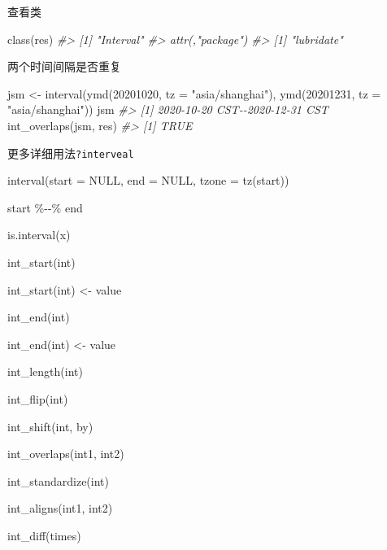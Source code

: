 \documentclass[
]{book}
\newenvironment{Shaded}{\begin{snugshade}}{\end{snugshade}}
\newcommand{\AttributeTok}[1]{\textcolor[rgb]{0.77,0.63,0.00}{#1}}
\newcommand{\CommentTok}[1]{\textcolor[rgb]{0.56,0.35,0.01}{\textit{#1}}}
\newcommand{\ConstantTok}[1]{\textcolor[rgb]{0.00,0.00,0.00}{#1}}
\newcommand{\DecValTok}[1]{\textcolor[rgb]{0.00,0.00,0.81}{#1}}
\newcommand{\FunctionTok}[1]{\textcolor[rgb]{0.00,0.00,0.00}{#1}}
\newcommand{\NormalTok}[1]{#1}
\newcommand{\OtherTok}[1]{\textcolor[rgb]{0.56,0.35,0.01}{#1}}
\newcommand{\SpecialCharTok}[1]{\textcolor[rgb]{0.00,0.00,0.00}{#1}}
\newcommand{\StringTok}[1]{\textcolor[rgb]{0.31,0.60,0.02}{#1}}
\begin{document}
查看类

\begin{Shaded}
\begin{Highlighting}[]
\FunctionTok{class}\NormalTok{(res)}
\CommentTok{\#\textgreater{} [1] "Interval"}
\CommentTok{\#\textgreater{} attr(,"package")}
\CommentTok{\#\textgreater{} [1] "lubridate"}
\end{Highlighting}
\end{Shaded}

两个时间间隔是否重复

\begin{Shaded}
\begin{Highlighting}[]
\NormalTok{jsm }\OtherTok{\textless{}{-}} \FunctionTok{interval}\NormalTok{(}\FunctionTok{ymd}\NormalTok{(}\DecValTok{20201020}\NormalTok{, }\AttributeTok{tz =} \StringTok{"asia/shanghai"}\NormalTok{), }\FunctionTok{ymd}\NormalTok{(}\DecValTok{20201231}\NormalTok{, }\AttributeTok{tz =} \StringTok{"asia/shanghai"}\NormalTok{))}
\NormalTok{jsm}
\CommentTok{\#\textgreater{} [1] 2020{-}10{-}20 CST{-}{-}2020{-}12{-}31 CST}
\FunctionTok{int\_overlaps}\NormalTok{(jsm, res)}
\CommentTok{\#\textgreater{} [1] TRUE}
\end{Highlighting}
\end{Shaded}

更多详细用法\texttt{?interveal}

\begin{Shaded}
\begin{Highlighting}[]
\FunctionTok{interval}\NormalTok{(}\AttributeTok{start =} \ConstantTok{NULL}\NormalTok{, }\AttributeTok{end =} \ConstantTok{NULL}\NormalTok{, }\AttributeTok{tzone =} \FunctionTok{tz}\NormalTok{(start))}

\NormalTok{start }\SpecialCharTok{\%{-}{-}\%}\NormalTok{ end}

\FunctionTok{is.interval}\NormalTok{(x)}

\FunctionTok{int\_start}\NormalTok{(int)}

\FunctionTok{int\_start}\NormalTok{(int) }\OtherTok{\textless{}{-}}\NormalTok{ value}

\FunctionTok{int\_end}\NormalTok{(int)}

\FunctionTok{int\_end}\NormalTok{(int) }\OtherTok{\textless{}{-}}\NormalTok{ value}

\FunctionTok{int\_length}\NormalTok{(int)}

\FunctionTok{int\_flip}\NormalTok{(int)}

\FunctionTok{int\_shift}\NormalTok{(int, by)}

\FunctionTok{int\_overlaps}\NormalTok{(int1, int2)}

\FunctionTok{int\_standardize}\NormalTok{(int)}

\FunctionTok{int\_aligns}\NormalTok{(int1, int2)}

\FunctionTok{int\_diff}\NormalTok{(times)}
\end{Highlighting}
\end{Shaded}
\end{document}
